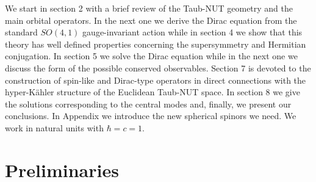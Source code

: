 \documentclass[a4paper,12pt]{article}
\begin{document}
We start in section 2 with a brief review of the Taub-NUT geometry and the 
main orbital operators. In the next one we derive the Dirac equation from 
the standard $SO(4,1)$ gauge-invariant action  while in section 4 we show 
that this theory has well defined properties  concerning  the supersymmetry 
and Hermitian conjugation. In section 5 we  solve the Dirac equation while 
in the next one we discuss the form of the possible conserved observables. 
Section 7 is devoted to the construction of spin-like and Dirac-type 
operators in direct connections with the hyper-K\" ahler structure of the 
Euclidean Taub-NUT space. In  section 8  we give the solutions corresponding 
to the central modes and, finally, we present our conclusions. In Appendix 
we introduce the new spherical spinors we need.  We work in natural units 
with $\hbar=c=1$.

\section{Preliminaries}
\
\end{document}

